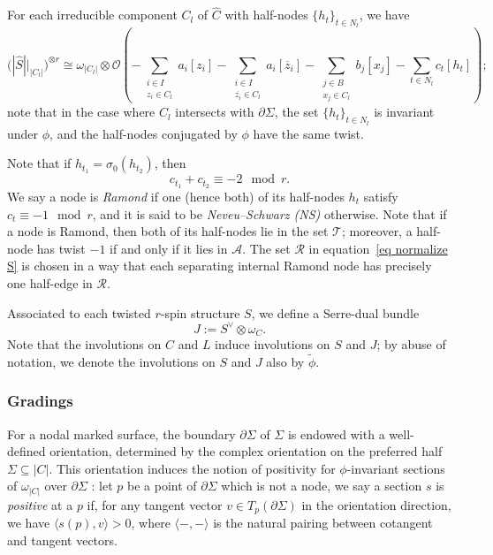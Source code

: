 \documentclass[11pt]{amsart}
\theoremstyle{definition}
\theoremstyle{remark}
\newcommand{\<}{\left<}
\renewcommand{\>}{\right>}
\numberwithin{equation}{section}
\begin{document}
For each irreducible component $C_l$ of $\widehat{C}$ with half-nodes $\{h_t\}_{t \in N_l}$, we %
have
$$\bigg(|\widehat{S}|\big|_{|C_l|}\bigg)^{\otimes r} \cong \omega_{|C_l|} \otimes {\mathcal{O}}\left(-\sum_{\substack{i \in I\\z_i\in C_l}} a_i[z_i] - \sum_{\substack{i \in I\\ \overline{z_i}\in C_l}} a_i [\overline{z}_i] - \sum_{\substack{j \in B\\ x_j\in C_l}} b_j[x_j] - \sum_{t \in N_l} c_t [h_t]\right);$$
note %
that in the case where $C_l$ intersects with $\partial \Sigma$, the set $\{h_t\}_{t \in N_l}$ is invariant under $\phi$, and the half-nodes conjugated by $\phi$ have the same twist.


Note that if $h_{t_1}=\sigma_0(h_{t_2})$, then
\begin{equation}\label{eq sum of twist at node}c_{t_1} + c_{t_2} \equiv -2 \mod r.\end{equation}
We say a node is \textit{Ramond} if one (hence both) of its half-nodes $h_t$ satisfy $c_t \equiv -1 \mod r$,  and it is said to be \textit{Neveu--Schwarz (NS)} otherwise. Note that if a node is Ramond, then both of its half-nodes lie in the set $\mathcal T$; moreover, a half-node has twist $-1$ if and only if it lies in $\mathcal A$. The set $\mathcal{R}$ in equation~\eqref{eq normalize S} is chosen in a way that each separating internal Ramond node has precisely
one half-edge in $\mathcal{R}.$ 


Associated to each twisted $r$-spin structure $S$, we define a Serre-dual bundle \begin{equation}\label{def of J}
    J:=S^{\vee} \otimes \omega_{C}.
\end{equation}
Note that the involutions on $C$ and $L$ induce involutions on $S$ and $J$; by abuse of notation, we denote the involutions on $S$ and $J$ also by $\widetilde{\phi}$.


\subsubsection{Gradings}
For a nodal marked surface, the boundary ${\partial}\Sigma$ of $\Sigma$ is endowed with a well-defined orientation, determined by the complex orientation on the preferred half $\Sigma \subseteq |C|$. This orientation induces the notion of positivity for $\phi$-invariant sections of $\omega_{|C|}$ over ${\partial} \Sigma$%
: let $p$ %
be a point of $\partial \Sigma$ which is not a node, we say a section $s$ is \textit{positive} at a $p$ if, for any tangent vector $v \in T_p({\partial} \Sigma)$ in the orientation direction, we have $\langle s(p), v \rangle > 0$, where $\langle -, - \rangle$ is the natural pairing between cotangent and tangent vectors.
\end{document}
